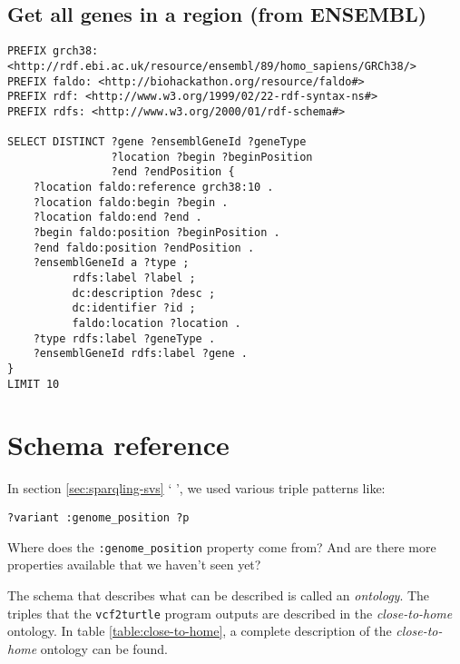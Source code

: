\documentclass[11pt,a4paper,oneside]{book}
\begin{document}
\subsection{Get all genes in a region (from ENSEMBL)}
\begin{siderules}
\begin{verbatim}
PREFIX grch38: <http://rdf.ebi.ac.uk/resource/ensembl/89/homo_sapiens/GRCh38/>
PREFIX faldo: <http://biohackathon.org/resource/faldo#>
PREFIX rdf: <http://www.w3.org/1999/02/22-rdf-syntax-ns#>
PREFIX rdfs: <http://www.w3.org/2000/01/rdf-schema#>

SELECT DISTINCT ?gene ?ensemblGeneId ?geneType 
                ?location ?begin ?beginPosition 
                ?end ?endPosition {
    ?location faldo:reference grch38:10 .
    ?location faldo:begin ?begin .
    ?location faldo:end ?end .
    ?begin faldo:position ?beginPosition .
    ?end faldo:position ?endPosition .
    ?ensemblGeneId a ?type ;
          rdfs:label ?label ;
          dc:description ?desc ;
          dc:identifier ?id ;
          faldo:location ?location .
    ?type rdfs:label ?geneType .
    ?ensemblGeneId rdfs:label ?gene .
}
LIMIT 10
\end{verbatim}
\end{siderules}



\section{Schema reference}

  In section \ref{sec:sparqling-svs} {\color{LinkGray}`%
  '}, we used various triple patterns like:

\begin{siderules}
\begin{verbatim}
?variant :genome_position ?p
\end{verbatim}
\end{siderules}

  Where does the \texttt{:genome\_position} property come from?  And are
  there more properties available that we haven't seen yet?

  The schema that describes what can be described is called an \emph{ontology}.
  The triples that the \texttt{vcf2turtle} program outputs are described in
  the \emph{close-to-home} ontology.  In table \ref{table:close-to-home}, a
  complete description of the \emph{close-to-home} ontology can be found.
\end{document}
